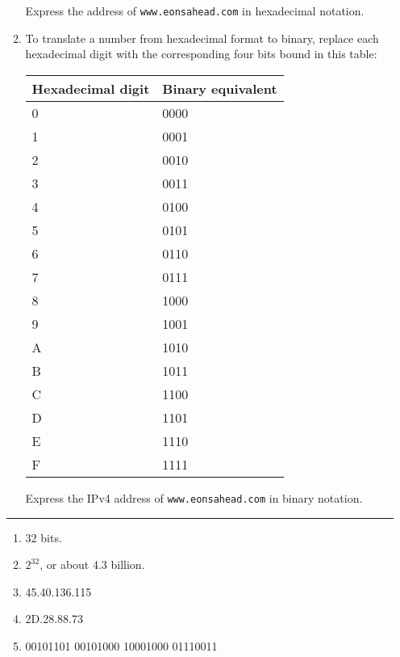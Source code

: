 \documentclass[twoside]{article}
\newenvironment{answer}
  {\vspace*{0.2cm} \rule{12cm}{0.04cm} \vspace*{0.2cm}}
  {\vspace*{0.2cm}}
\begin{document}
\begin{enumerate}
\begin{enumerate}
\begin{itemize}
      \end{itemize}

      Express the address of \verb+www.eonsahead.com+ in hexadecimal
      notation.

    \item To translate a number from hexadecimal format to binary,
      replace each hexadecimal digit with the corresponding
      four bits bound in this table:

      \begin{tabular}{l|l}
        \textbf{Hexadecimal digit} & \textbf{Binary equivalent} \\ \hline
        0 & 0000 \\
        1 & 0001 \\
        2 & 0010 \\
        3 & 0011 \\
        4 & 0100 \\
        5 & 0101 \\
        6 & 0110 \\
        7 & 0111 \\
        8 & 1000 \\
        9 & 1001 \\
        A & 1010 \\
        B & 1011 \\
        C & 1100 \\
        D & 1101 \\
        E & 1110 \\
        F & 1111 \\
        \end{tabular}

      Express the IPv4 address of \verb+www.eonsahead.com+ in binary
      notation.
 
    \end{enumerate}

  \begin{answer}

  \begin{enumerate}
    \item 32 bits.
    \item $2^32$, or about 4.3 billion.
    \item 45.40.136.115
    \item 2D.28.88.73
    \item 00101101 00101000 10001000 01110011
    \end{enumerate}

    \end{answer}


\end{enumerate}
\end{document}
